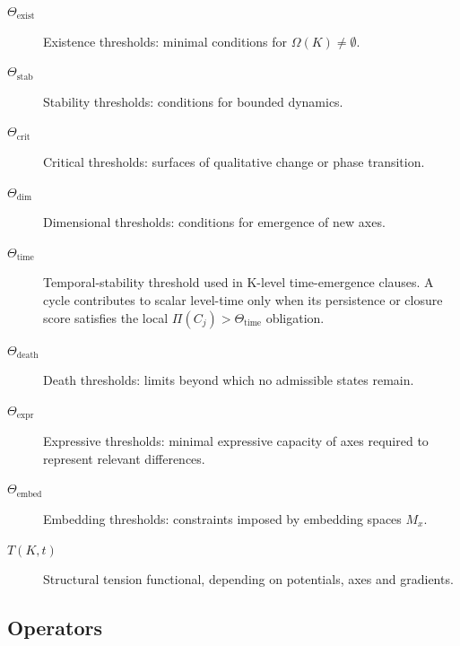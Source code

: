 \begin{description}
  \item[\(\Theta_{\mathrm{exist}}\)] Existence thresholds:
        minimal conditions for \(\Omega(K)\neq\emptyset\).
  \item[\(\Theta_{\mathrm{stab}}\)] Stability thresholds:
        conditions for bounded dynamics.
  \item[\(\Theta_{\mathrm{crit}}\)] Critical thresholds:
        surfaces of qualitative change or phase transition.
  \item[\(\Theta_{\mathrm{dim}}\)] Dimensional thresholds:
        conditions for emergence of new axes.
  \item[\(\Theta_{\mathrm{time}}\)] Temporal-stability threshold used in
        K-level time-emergence clauses. A cycle contributes to scalar level-time
        only when its persistence or closure score satisfies the local
        \(\Pi(C_j)>\Theta_{\mathrm{time}}\) obligation.
  \item[\(\Theta_{\mathrm{death}}\)] Death thresholds:
        limits beyond which no admissible states remain.
  \item[\(\Theta_{\mathrm{expr}}\)] Expressive thresholds:
        minimal expressive capacity of axes required to represent relevant
        differences.
  \item[\(\Theta_{\mathrm{embed}}\)] Embedding thresholds:
        constraints imposed by embedding spaces \(M_x\).
  \item[\(T(K,t)\)] Structural tension functional, depending on potentials,
        axes and gradients.
\end{description}

\subsection{Operators}


